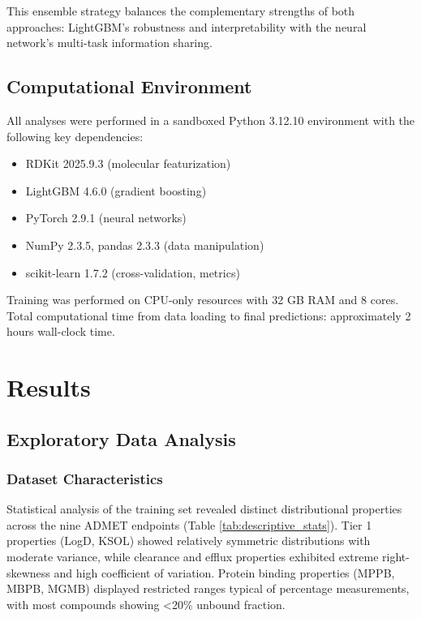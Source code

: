 \documentclass[11pt,a4paper]{article}
\begin{document}
This ensemble strategy balances the complementary strengths of both approaches: LightGBM's robustness and interpretability with the neural network's multi-task information sharing.

\subsection{Computational Environment}

All analyses were performed in a sandboxed Python 3.12.10 environment with the following key dependencies:
\begin{itemize}
    \item RDKit 2025.9.3 (molecular featurization)
    \item LightGBM 4.6.0 (gradient boosting)
    \item PyTorch 2.9.1 (neural networks)
    \item NumPy 2.3.5, pandas 2.3.3 (data manipulation)
    \item scikit-learn 1.7.2 (cross-validation, metrics)
\end{itemize}

Training was performed on CPU-only resources with 32 GB RAM and 8 cores. Total computational time from data loading to final predictions: approximately 2 hours wall-clock time.

\section{Results}

\subsection{Exploratory Data Analysis}

\subsubsection{Dataset Characteristics}

Statistical analysis of the training set revealed distinct distributional properties across the nine ADMET endpoints (Table \ref{tab:descriptive_stats}). Tier 1 properties (LogD, KSOL) showed relatively symmetric distributions with moderate variance, while clearance and efflux properties exhibited extreme right-skewness and high coefficient of variation. Protein binding properties (MPPB, MBPB, MGMB) displayed restricted ranges typical of percentage measurements, with most compounds showing <20\% unbound fraction.
\end{document}
